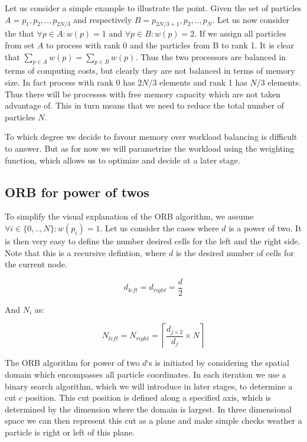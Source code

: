 \documentclass[]{article}
\begin{document}
Let us consider a simple example to illustrate the point. Given the set of particles $A = {p_1, p_2, .., p_{2N/3}}$ and respectively $B = {p_{2N/3 + 1}, p_2, .., p_{N}}$. Let us now consider the that $\forall p \in A : w(p) = 1$ and $\forall p \in B : w(p) = 2$. If we assign all particles from set $A$ to process with rank 0 and the particles from B to rank 1. It is clear that $\sum_{p\in A}^{} w(p) = \sum_{p\in B}^{} w(p)$. Thus the two processors are balanced in terms of computing costs, but clearly they are not balanced in terms of memory size. In fact process with rank 0 has $2N/3$ elements and rank 1 has $N/3$ elements. Thus there will be processes with free memory capacity which are not taken advantage of. This in turn means that we need to reduce the total number of particles $N$. 

To which degree we decide to favour memory over workload balancing is difficult to answer. But as for now we will parametrize the workload using the weighting function, which allows us to optimize and decide at a later stage.


\subsection{ORB for power of twos}

To simplify the visual explanation of the ORB algorithm, we assume $\forall i \in \{0,..,N\} : w(p_i) = 1$.
Let us consider the cases where $d$ is a power of two. It is then very easy to define the number desired cells for the left and the right side. Note that this is a recursive defintion, where $d$ is the desired number of cells for the current node.

\begin{center}
	\begin{equation}
		d_{left} = d_{right} = \frac{d}{2}
	\end{equation}
\end{center}

And $N_i$ as:

\begin{center}
	\begin{equation}
		N_{left} = N_{right} = \left \lceil \frac{ d_{j \times 2} }{d_{j}} \times N \right \rceil
	\end{equation}
\end{center}

The ORB algorithm for power of two $d$`s is initiated by considering the spatial domain which encompasses all particle coordinates. In each iteration we use a binary search algorithm, which we will introduce in later stages, to determine a cut $c$ position. This cut position is defined along a specified axis, which is determined by the dimension where the domain is largest. In three dimensional space we can then represent this cut as a plane and make simple checks weather a particle is right or left of this plane. 
\end{document}
